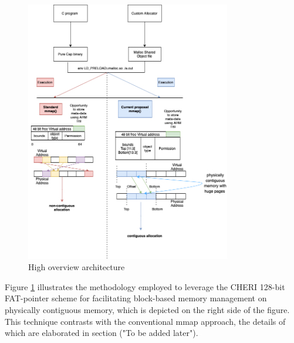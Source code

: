 \documentclass[acmsmall,screen,review]{acmart}
\begin{document}
\begin{figure}[h]
  \includegraphics[width=0.8\textwidth]{diagrams/HighOverviewArchitecture24.png}
  \caption{High overview architecture}
  \label{fig:HighOverviewArchitecture}
\end{figure}



Figure \ref{fig:HighOverviewArchitecture} illustrates the methodology employed to leverage the CHERI 
128-bit FAT-pointer scheme for facilitating block-based memory management
 on physically contiguous memory, which is depicted on the right side of the figure. 
 This technique contrasts with the conventional mmap approach, the details of which 
 are elaborated in section ("To be added later").
\end{document}
